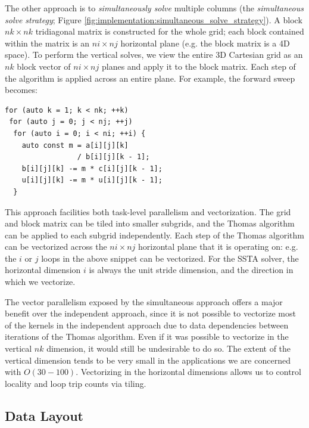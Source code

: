 \documentclass{sig-alternate-05-2015}
\begin{document}
The other approach is to \emph{simultaneously solve} multiple columns (the
  \emph{simultaneous solve strategy}; Figure
  \ref{fig:implementation:simultaneous_solve_strategy}).
A block \(nk \times nk\) tridiagonal matrix is constructed for the whole grid;
  each block contained within the matrix is an \(ni \times nj\) horizontal plane
  (e.g. the block matrix is a 4D space).
To perform the vertical solves, we view the entire 3D Cartesian grid as an
  \(nk\) block vector of \(ni \times nj\) planes and apply it to the block
  matrix.
Each step of the algorithm is applied across an entire plane.
For example, the forward sweep becomes:
\begin{lstlisting}
for (auto k = 1; k < nk; ++k)
 for (auto j = 0; j < nj; ++j)
  for (auto i = 0; i < ni; ++i) {
    auto const m = a[i][j][k]
                 / b[i][j][k - 1];
    b[i][j][k] -= m * c[i][j][k - 1];
    u[i][j][k] -= m * u[i][j][k - 1];
  } 
\end{lstlisting}
This approach facilities both task-level parallelism and vectorization.
The grid and block matrix can be tiled into smaller subgrids, and the Thomas
  algorithm can be applied to each subgrid independently.
Each step of the Thomas algorithm can be vectorized across the \(ni \times nj\)
  horizontal plane that it is operating on: e.g. the \(i\) or \(j\) loops in the
  above snippet can be vectorized.
For the SSTA solver, the horizontal dimension \(i\) is always the unit stride
  dimension, and the direction in which we vectorize.

The vector parallelism exposed by the simultaneous approach offers a major
  benefit over the independent approach, since it is not possible to vectorize
  most of the kernels in the independent approach due to data dependencies
  between iterations of the Thomas algorithm.
Even if it was possible to vectorize in the vertical \(nk\) dimension, it would
  still be undesirable to do so.
The extent of the vertical dimension tends to be very small in the applications
  we are concerned with \(O(30-100)\).
Vectorizing in the horizontal dimensions allows us to control locality and loop
  trip counts via tiling.

\subsection{Data Layout}
\label{sec:implementation:data_layout}
\end{document}
